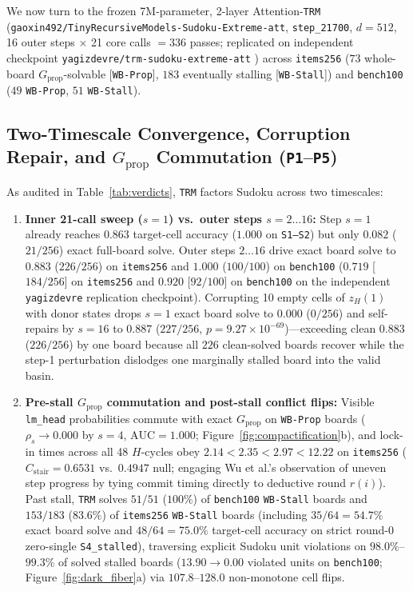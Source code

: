 \documentclass[10pt,letterpaper]{article}
\newcommand{\Gprop}{G_{\mathrm{prop}}}
\begin{document}
We now turn to the frozen 7M-parameter, 2-layer Attention-\texttt{TRM} (\texttt{gaoxin492/\allowbreak TinyRecursiveModels-\allowbreak Sudoku-\allowbreak Extreme-\allowbreak att}, \texttt{step\_21700}, $d=512$, 16 outer steps $\times$ 21 core calls $= 336$ passes; replicated on independent checkpoint \texttt{yagizdevre/\allowbreak trm-\allowbreak sudoku-\allowbreak extreme-\allowbreak att} \cite{jolicoeur2025trm}) across \texttt{items256} ($73$ whole-board $\Gprop$-solvable [\texttt{WB-Prop}], $183$ eventually stalling [\texttt{WB-Stall}]) and \texttt{bench100} ($49$ \texttt{WB-Prop}, $51$ \texttt{WB-Stall}).

\subsection{Two-Timescale Convergence, Corruption Repair, and \texorpdfstring{$\Gprop$}{G\_prop} Commutation (\texttt{P1}--\texttt{P5})}

As audited in Table~\ref{tab:verdicts}, \texttt{TRM} factors Sudoku across two timescales:
\begin{enumerate}[topsep=3pt,itemsep=2pt]
  \item \textbf{Inner 21-call sweep ($s=1$) vs.\ outer steps $s=2\dots 16$:} Step $s=1$ already reaches $0.863$ target-cell accuracy ($1.000$ on \texttt{S1--S2}) but only $0.082$ ($21/256$) exact full-board solve. Outer steps $2\dots 16$ drive exact board solve to $\mathbf{0.883}$ ($226/256$) on \texttt{items256} and $\mathbf{1.000}$ ($100/100$) on \texttt{bench100} ($\mathbf{0.719}$ [$184/256$] on \texttt{items256} and $\mathbf{0.920}$ [$92/100$] on \texttt{bench100} on the independent \texttt{yagizdevre} replication checkpoint). Corrupting 10 empty cells of $z_H(1)$ with donor states drops $s=1$ exact board solve to $0.000$ ($0/256$) and self-repairs by $s=16$ to $\mathbf{0.887}$ ($227/256$, $p=9.27\times 10^{-69}$)—exceeding clean $0.883$ ($226/256$) by one board because all $226$ clean-solved boards recover while the step-1 perturbation dislodges one marginally stalled board into the valid basin.
  \item \textbf{Pre-stall $\Gprop$ commutation and post-stall conflict flips:} Visible \texttt{lm\_head} probabilities commute with exact $\Gprop$ on \texttt{WB-Prop} boards ($\rho_s \to 0.000$ by $s=4$, $\mathrm{AUC}=1.000$; Figure~\ref{fig:compactification}b), and lock-in times across all 48 $H$-cycles obey $2.14 < 2.35 < 2.97 < 12.22$ on \texttt{items256} ($C_{\mathrm{stair}}=0.6531$ vs.\ $0.4947$ null; engaging Wu et al.'s \cite{wu2026shared} observation of uneven step progress by tying commit timing directly to deductive round $r(i)$). Past stall, \texttt{TRM} solves $51/51$ ($100\%$) of \texttt{bench100} \texttt{WB-Stall} boards and $153/183$ ($83.6\%$) of \texttt{items256} \texttt{WB-Stall} boards (including $35/64 = 54.7\%$ exact board solve and $48/64 = 75.0\%$ target-cell accuracy on strict round-0 zero-single \texttt{S4\_stalled}), traversing explicit Sudoku unit violations on $98.0\%$--$99.3\%$ of solved stalled boards ($13.90 \to 0.00$ violated units on \texttt{bench100}; Figure~\ref{fig:dark_fiber}a) via $107.8$--$128.0$ non-monotone cell flips.
\end{enumerate}
\end{document}
